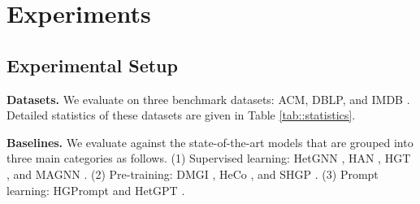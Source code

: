 \section{Experiments}

\begin{table}[b]
    \caption{Statistics of the datasets}
    \centering
    \label{tab::statistics}
\end{table}

\subsection{Experimental Setup}

\noindent\textbf{Datasets.} We evaluate \ourmethod on three benchmark datasets: ACM, DBLP, and IMDB \cite{HAN,MAGNN}. Detailed statistics of these datasets are given in Table \ref{tab::statistics}.

\noindent\textbf{Baselines.} We evaluate \ourmethod against the state-of-the-art models that are grouped into three main categories as follows. (1) Supervised learning: HetGNN \cite{HetGNN}, HAN \cite{HAN}, HGT \cite{HGT}, and MAGNN \cite{MAGNN}. (2) Pre-training: DMGI \cite{DMGI}, HeCo \cite{HeCo}, and SHGP \cite{SHGP}. (3) Prompt learning: HGPrompt \cite{HGPrompt} and HetGPT \cite{HetGPT}.

